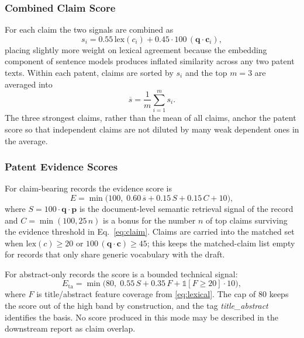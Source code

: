 \documentclass[journal]{IEEEtran}
\begin{document}
\subsubsection{Combined Claim Score}
For each claim the two signals are combined as
\begin{equation}
s_i = 0.55\,\mathrm{lex}(c_i) + 0.45 \cdot 100\,(\mathbf{q} \cdot \mathbf{c}_i),
\label{eq:claim}
\end{equation}
placing slightly more weight on lexical agreement because the embedding component of sentence models produces inflated similarity across any two patent texts. Within each patent, claims are sorted by $s_i$ and the top $m = 3$ are averaged into
\begin{equation}
\overline{s} = \frac{1}{m} \sum_{i=1}^{m} s_i .
\label{eq:coverage}
\end{equation}
The three strongest claims, rather than the mean of all claims, anchor the patent score so that independent claims are not diluted by many weak dependent ones in the average.

\subsubsection{Patent Evidence Scores}
For claim-bearing records the evidence score is
\begin{equation}
E = \min\!\bigl(100,\; 0.60\,\overline{s} + 0.15\,S + 0.15\,C + 10\bigr),
\label{eq:evidence}
\end{equation}
where $S = 100 \cdot \mathbf{q}\cdot\mathbf{p}$ is the document-level semantic retrieval signal of the record and $C = \min(100, 25\,n)$ is a bonus for the number $n$ of top claims surviving the evidence threshold in Eq.~\eqref{eq:claim}. Claims are carried into the matched set when $\mathrm{lex}(c) \ge 20$ or $100\,(\mathbf{q}\cdot\mathbf{c}) \ge 45$; this keeps the matched-claim list empty for records that only share generic vocabulary with the draft.

For abstract-only records the score is a bounded technical signal:
\begin{equation}
E_{\mathrm{ta}} = \min\!\bigl(80,\; 0.55\,S + 0.35\,F + \mathbb{1}[F \ge 20]\cdot 10\bigr),
\label{eq:fallback}
\end{equation}
where $F$ is title/abstract feature coverage from \eqref{eq:lexical}. The cap of 80 keeps the score out of the high band by construction, and the tag \emph{title\_abstract} identifies the basis. No score produced in this mode may be described in the downstream report as claim overlap.
\end{document}
